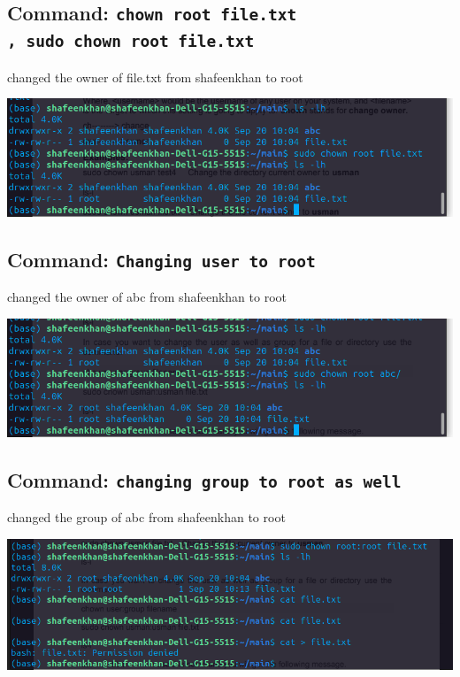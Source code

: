 \documentclass[a4paper,12pt]{article}
\begin{document}
\subsection{Command: \texttt{chown root file.txt \\, sudo chown root file.txt}}
changed the owner of file.txt from shafeenkhan to root
\begin{center}
    \includegraphics[width=\linewidth]{Screenshot from 2024-09-20 10-07-54.png}
\end{center}

\subsection{Command: \texttt{Changing user to root}}
changed the owner of abc from shafeenkhan to root
\begin{center}
    \includegraphics[width=\linewidth]{Screenshot from 2024-09-20 10-11-34.png}
\end{center}


\subsection{Command: \texttt{changing group to root as well}}
changed the group of abc from shafeenkhan to root
\begin{center}
    \includegraphics[width=\linewidth]{Screenshot from 2024-09-20 10-15-27.png}
\end{center}
\end{document}
